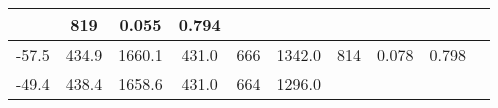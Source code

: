 \documentclass[a4paper,10pt]{article}
\begin{document}
\begin{longtable}{
     |
%    
    c|
%    
    c|
%    
    c|
%    
    c|
%    
    c|
%    
    c|
%    
    c|
%    
    c|
%    
    c|
%    
    c|
%    
    }
%        
        & 819
%        

%        

%        
        & 0.055
%        

%        

%        
        & 0.794
%        

%        
        \\
        \hline

        

%        

%        
        -57.5
%        

%        

%        
        & 434.9
%        

%        

%        
        & 1660.1
%        

%        

%        
        & 431.0
%        

%        

%        
        & 666
%        

%        

%        
        & 1342.0
%        

%        

%        
        & 814
%        

%        

%        
        & 0.078
%        

%        

%        
        & 0.798
%        

%        
        \\
        \hline

        

%        

%        
        -49.4
%        

%        

%        
        & 438.4
%        

%        

%        
        & 1658.6
%        

%        

%        
        & 431.0
%        

%        

%        
        & 664
%        

%        

%        
        & 1296.0
%        

%        


\end{longtable}
\end{document}
